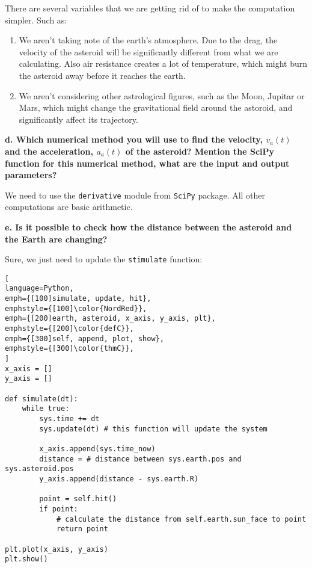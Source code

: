 \documentclass[article, 12pt, a4paper]{memoir}
\begin{document}
\begin{solution}
    [c]
    There are several variables that we are getting rid of to make the computation
    simpler. Such as:
    \begin{enumerate}[left=0pt]
        \item We aren't taking note of the earth's atmosphere. Due to the drag, the
            velocity of the asteroid will be significantly different from what we are
            calculating. Also air resistance creates a lot of temperature, which might
            burn the asteroid away before it reaches the earth.
        \item We aren't considering other astrological figures, such as the Moon, Jupitar
            or Mars, which might change the gravitational field around the astoroid, and
            significantly affect its trajectory.
    \end{enumerate}
\end{solution}

\textbf{d. Which numerical method you will use to find the velocity, $v_a(t)$ and the
acceleration, $a_a(t)$ of the asteroid? Mention the SciPy function for this numerical
method, what are the input and output parameters?}
\vspace{1em}

\begin{solution}
    [d]
    We need to use the \texttt{derivative} module from \texttt{SciPy} package. All other
    computations are basic arithmetic.
\end{solution}

\textbf{e. Is it possible to check how the distance between the asteroid and the Earth are
changing?}
\vspace{1em}

\begin{solution}
    Sure, we just need to update the \texttt{stimulate} function:
    
\begin{lstlisting}[
language=Python,
emph={[100]simulate, update, hit},
emphstyle={[100]\color{NordRed}},
emph={[200]earth, asteroid, x_axis, y_axis, plt},
emphstyle={[200]\color{defC}},
emph={[300]self, append, plot, show},
emphstyle={[300]\color{thmC}},
]
x_axis = []
y_axis = []

def simulate(dt):
    while true:
        sys.time += dt
        sys.update(dt) # this function will update the system
        
        x_axis.append(sys.time_now)
        distance = # distance between sys.earth.pos and sys.asteroid.pos
        y_axis.append(distance - sys.earth.R)

        point = self.hit()
        if point:
            # calculate the distance from self.earth.sun_face to point
            return point

plt.plot(x_axis, y_axis)
plt.show()
\end{lstlisting}
\end{solution}
\end{document}
